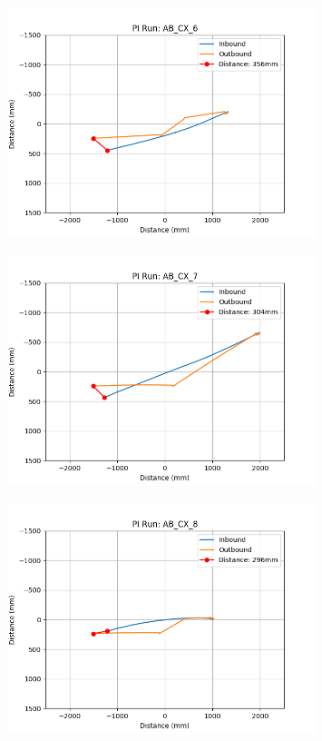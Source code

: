 \documentclass[a4paper,11pt,twoside,openright]{article}
\begin{document}
\begin{figure}[h!]
  \centering
  \includegraphics[width=0.8\textwidth]{AB_CX_6}
  \caption{\label{fig:abcx6}}
\end{figure}

\begin{figure}[h!]
  \centering
  \includegraphics[width=0.8\textwidth]{AB_CX_7}
  \caption{\label{fig:abcx7}}
\end{figure}

\begin{figure}[h!]
  \centering
  \includegraphics[width=0.8\textwidth]{AB_CX_8}
  \caption{\label{fig:abcx8}}
\end{figure}
\end{document}
